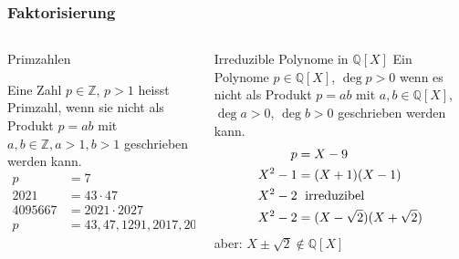 %
%
%
\begin{frame}[t]
\frametitle{Faktorisierung}
\begin{columns}[t,onlytextwidth]
\begin{column}{0.48\textwidth}
\begin{block}{Primzahlen\strut}
Eine Zahl $p\in\mathbb{Z}$, $p>1$ heisst Primzahl, wenn sie nicht als Produkt
$p=ab$ mit $a,b\in\mathbb{Z},a>1, b>1$ geschrieben werden kann.
\begin{align*}
p&=7
\\
2021 &= 43 \cdot 47
\\
4095667&=2021\cdot 2027
\\
p&=43, 47, 1291, 2017, 2027
\end{align*}
\end{block}
\end{column}
\begin{column}{0.48\textwidth}
\begin{block}{Irreduzible Polynome in $\mathbb{Q}[X]$}
Ein Polynome $p\in\mathbb{Q}[X]$, $\deg p>0$ wenn es nicht als Produkt
$p=ab$ mit $a,b\in\mathbb{Q}[X]$, $\deg a>0$, $\deg b>0$ geschrieben
werden kann.
\begin{align*}
p&=X-9
\\
X^2-1&= (X+1)(X-1)
\\
X^2-2&\text{\; irreduzibel}
\\
X^2-2&=(X-\sqrt{2})(X+\sqrt{2})
\end{align*}
aber: $X\pm\sqrt{2}\not\in\mathbb{Q}[X]$
\end{block}
\end{column}
\end{columns}
\end{frame}
